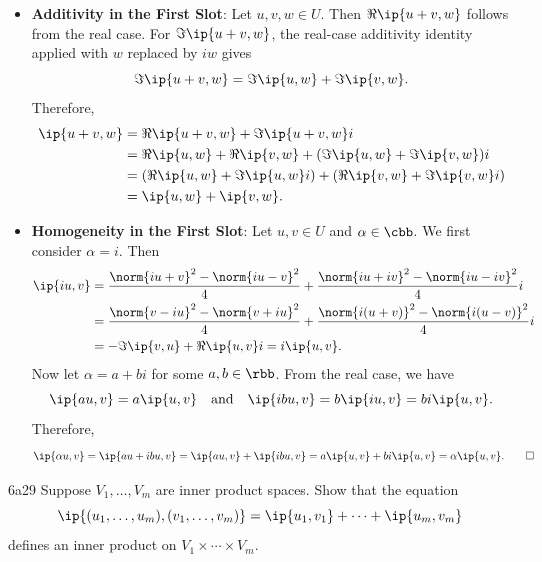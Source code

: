 \begin{sol}
\begin{itemize}
\begin{align*}
            &= \frac{\norm{v - iu}^2 - \norm{v + iu}^2}{4} \\
            &= -\Im\ip{v, u}.
        \end{align*}
        Therefore, $\ip{u, v} = \Re\ip{u, v} + \Im\ip{u, v}i = \Re\ip{v, u} - \Im\ip{v, u}i = \bar{\ip{v, u}}$.
        \item \textbf{Additivity in the First Slot}: Let $u, v, w \in U$.
        Then $\Re\ip{u + v, w}$ follows from the real case.
        For $\Im\ip{u + v, w}$, the real-case additivity identity applied with $w$ replaced by $iw$ gives
        \[
            \Im\ip{u + v, w} = \Im\ip{u, w} + \Im\ip{v, w}.
        \]
        Therefore,
        \begin{align*}
            \ip{u + v, w} &= \Re\ip{u + v, w} + \Im\ip{u + v, w}i \\
            &= \Re\ip{u, w} + \Re\ip{v, w} + (\Im\ip{u, w} + \Im\ip{v, w})i \\
            &= (\Re\ip{u, w} + \Im\ip{u, w}i) + (\Re\ip{v, w} + \Im\ip{v, w}i) \\
            &= \ip{u, w} + \ip{v, w}.
        \end{align*}
        \item \textbf{Homogeneity in the First Slot}: Let $u, v \in U$ and $\alpha \in \cbb$.
        We first consider $\alpha = i$.
        Then
        \begin{align*}
            \ip{iu, v} &= \frac{\norm{iu + v}^2 - \norm{iu - v}^2}{4} + \frac{\norm{iu + iv}^2 - \norm{iu - iv}^2}{4}i \\
            &= \frac{\norm{v - iu}^2 - \norm{v + iu}^2}{4} + \frac{\norm{i(u + v)}^2 - \norm{i(u - v)}^2}{4}i \\
            &= -\Im\ip{v, u} + \Re\ip{u, v}i = i\ip{u, v}.
        \end{align*}
        Now let $\alpha = a + bi$ for some $a, b \in \rbb$.
        From the real case, we have
        \[
            \ip{au, v} = a\ip{u, v} \quad \text{and} \quad \ip{ibu, v} = b\ip{iu, v} = bi\ip{u, v}.
        \]
        Therefore,
        \[
            \ip{\alpha u, v} = \ip{au + ibu, v} = \ip{au, v} + \ip{ibu, v} = a\ip{u, v} + bi\ip{u, v} = \alpha\ip{u, v}. \qedhere
        \]
    \end{itemize}
\end{sol}

\begin{exercise}{6a29}
    Suppose $V_1, \ldots, V_m$ are inner product spaces.
    Show that the equation
    \[
        \ip{(u_1, \ldots, u_m), (v_1, \ldots, v_m)} = \ip{u_1, v_1} + \cdots + \ip{u_m, v_m}
    \]
    defines an inner product on $V_1 \times \cdots \times V_m$.
    
\end{exercise}

